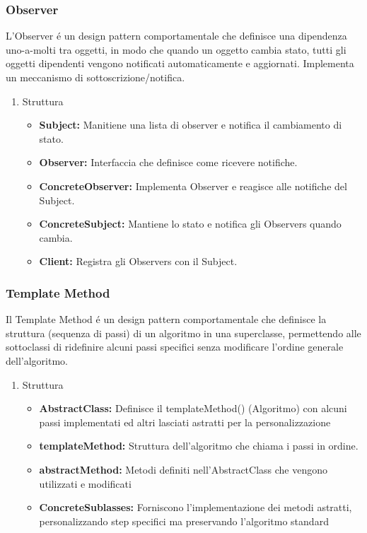 \documentclass[11pt]{article}
\begin{document}
\subsubsection{Observer}
\label{sec:orge4b6c6a}
L'Observer é un design pattern comportamentale che definisce una dipendenza uno-a-molti tra oggetti, in modo che quando un oggetto cambia stato, tutti gli oggetti dipendenti vengono notificati automaticamente e aggiornati. Implementa un meccanismo di sottoscrizione/notifica.
\begin{enumerate}
\item Struttura
\label{sec:org7e5081d}
\begin{itemize}
\item \textbf{\textbf{Subject:}} Manitiene una lista di observer e notifica il cambiamento di stato.
\item \textbf{\textbf{Observer:}} Interfaccia che definisce come ricevere notifiche.
\item \textbf{\textbf{ConcreteObserver:}} Implementa Observer e reagisce alle notifiche del Subject.
\item \textbf{\textbf{ConcreteSubject:}} Mantiene lo stato e notifica gli Observers quando cambia.
\item \textbf{\textbf{Client:}} Registra gli Observers con il Subject.
\end{itemize}
\end{enumerate}
\subsubsection{Template Method}
\label{sec:orge641b57}
Il Template Method é un design pattern comportamentale che definisce la struttura (sequenza di passi) di un algoritmo in una superclasse, permettendo alle sottoclassi di ridefinire alcuni passi specifici senza modificare l'ordine generale dell'algoritmo.
\begin{enumerate}
\item Struttura
\label{sec:org8492f89}
\begin{itemize}
\item \textbf{\textbf{AbstractClass:}} Definisce il templateMethod() (Algoritmo) con alcuni passi implementati ed altri lasciati astratti per la personalizzazione
\item \textbf{\textbf{templateMethod:}} Struttura dell'algoritmo che chiama i passi in ordine.
\item \textbf{\textbf{abstractMethod:}} Metodi definiti nell'AbstractClass che vengono utilizzati e modificati
\item \textbf{\textbf{ConcreteSublasses:}} Forniscono l'implementazione dei metodi astratti, personalizzando step specifici ma preservando l'algoritmo standard
\end{itemize}
\end{enumerate}
\end{document}

